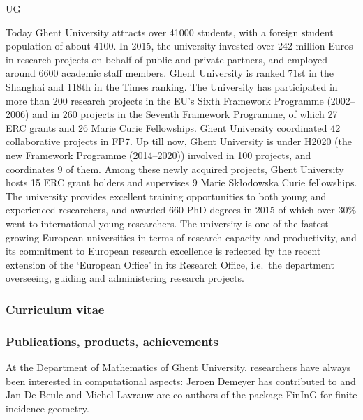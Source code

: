 \begin{sitedescription}{UG}

Today Ghent University attracts over 41000 students, with a foreign student population of about 4100.
In 2015, the university invested over 242 million Euros in research projects
on behalf of public and private partners, and employed around 6600 academic staff members.
Ghent University is ranked 71st in the Shanghai and 118th in the Times ranking.
The University has participated in more than 200 research projects in the EU's Sixth Framework Programme (2002--2006)
and in 260 projects in the Seventh Framework Programme, of which 27 ERC grants and 26 Marie Curie Fellowships.
Ghent University coordinated 42 collaborative projects in FP7.
Up till now, Ghent University is under H2020 (the new Framework Programme (2014--2020)) involved in 100 projects, and coordinates 9 of them.
Among these newly acquired projects, Ghent University hosts 15 ERC grant holders and supervises 9 Marie Sk{\l}odowska Curie fellowships.
The university provides excellent training opportunities to both young and experienced researchers,
and awarded 660 PhD degrees in 2015 of which over 30\% went to international young researchers.
The university is one of the fastest growing European universities in terms of research capacity and productivity,
and its commitment to European research excellence is reflected by the recent extension of the `European Office'
in its Research Office, i.e.~the department overseeing, guiding and administering research projects.

\subsubsection*{Curriculum vitae}



\subsubsection*{Publications, products, achievements}

At the Department of Mathematics of Ghent University,
researchers have always been interested in computational aspects:
Jeroen Demeyer has contributed to \Sage{} and
Jan De Beule and Michel Lavrauw are co-authors
of the \GAP{} package FinInG for finite incidence geometry.

%


\end{sitedescription}
